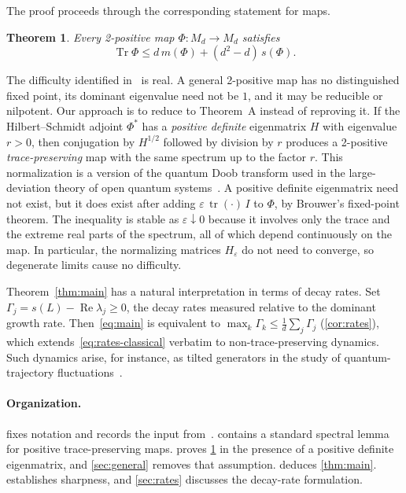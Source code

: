 \documentclass[11pt,a4paper]{article}
\theoremstyle{plain}
\newtheorem{theorem}{Theorem}
\theoremstyle{definition}
\theoremstyle{remark}
\numberwithin{equation}{section}
\newcommand{\M}{M_d}
\newcommand{\tr}{\operatorname{tr}}
\newcommand{\Tr}{\operatorname{Tr}}
\newcommand{\Rea}{\operatorname{Re}}
\newcommand{\mmin}{m}
\newcommand{\smax}{s}
\newcommand{\eps}{\varepsilon}
\begin{document}
The proof proceeds through the corresponding statement for maps.

\begin{theorem}\label{thm:maps}
Every 2-positive map $\Phi\colon\M\to\M$ satisfies
\begin{equation}\label{eq:maps}
  \Tr\Phi\le d\,\mmin(\Phi)+(d^2-d)\,\smax(\Phi).
\end{equation}
\end{theorem}

The difficulty identified in~\cite{vEC+26} is real. A general 2-positive map has
no distinguished fixed point, its dominant eigenvalue need not be $1$, and it
may be reducible or nilpotent. Our approach is to reduce to Theorem~A instead of
reproving it. If the Hilbert--Schmidt adjoint $\Phi^*$ has a \emph{positive
definite} eigenmatrix $H$ with eigenvalue $r>0$, then conjugation by $H^{1/2}$
followed by division by $r$ produces a 2-positive \emph{trace-preserving} map
with the same spectrum up to the factor $r$. This normalization is a version of
the quantum Doob transform used in the large-deviation theory of open quantum
systems~\cite{CGLP18}. A positive definite eigenmatrix need not exist, but it does
exist after adding $\eps\,\tr(\cdot)\,I$ to $\Phi$, by Brouwer's fixed-point
theorem. The inequality is stable as $\eps\downarrow0$ because it involves only
the trace and the extreme real parts of the spectrum, all of which depend
continuously on the map. In particular, the normalizing matrices $H_\eps$ do not
need to converge, so degenerate limits cause no difficulty.

Theorem~\ref{thm:main} has a natural interpretation in terms of decay rates. Set
$\Gamma_j=\smax(L)-\Rea\lambda_j\ge0$, the decay rates measured relative to the
dominant growth rate. Then~\eqref{eq:main} is equivalent to
$\max_k\Gamma_k\le\frac1d\sum_j\Gamma_j$
(\cref{cor:rates}), which extends~\eqref{eq:rates-classical} verbatim to
non-trace-preserving dynamics. Such dynamics arise, for instance, as tilted
generators in the study of quantum-trajectory fluctuations~\cite{CGLP18}.

\paragraph{Organization.}
 fixes notation and records the input from~\cite{vEC+26}.
 contains a standard spectral lemma for positive
trace-preserving maps.  proves \cref{thm:maps} in the
presence of a positive definite eigenmatrix, and \cref{sec:general} removes that
assumption.  deduces \cref{thm:main}. 
establishes sharpness, and \cref{sec:rates} discusses the decay-rate formulation.
\end{document}
